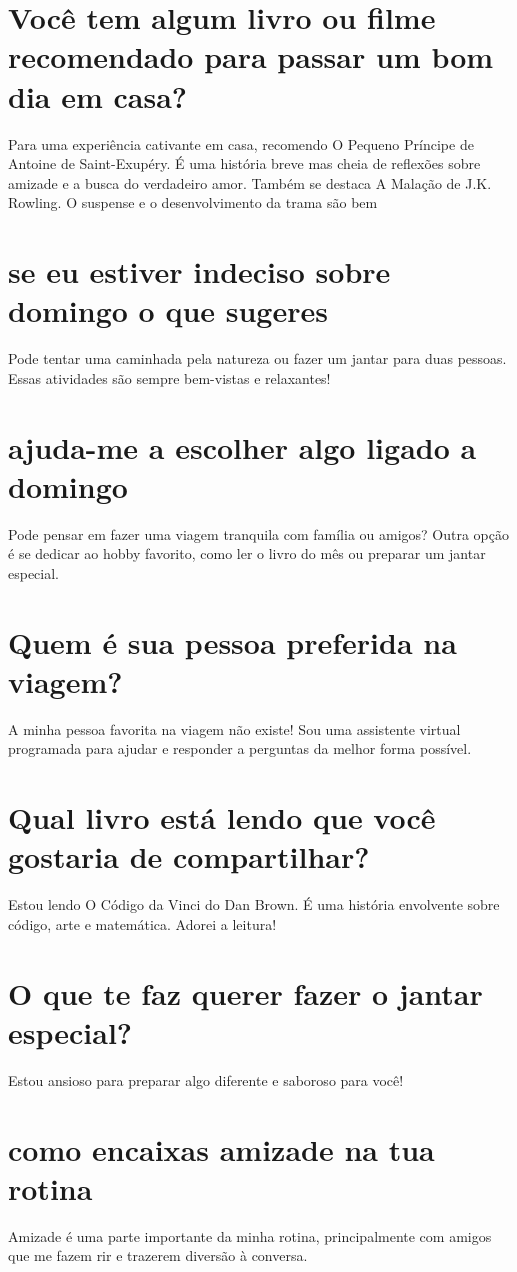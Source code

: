 \documentclass[11pt,a4paper]{article}
\begin{document}
\section{Você tem algum livro ou filme recomendado para passar um bom dia em casa?}
Para uma experiência cativante em casa, recomendo O Pequeno Príncipe de Antoine de Saint-Exupéry. É uma história breve mas cheia de reflexões sobre amizade e a busca do verdadeiro amor. Também se destaca A Malação de J.K. Rowling. O suspense e o desenvolvimento da trama são bem

\section{se eu estiver indeciso sobre domingo o que sugeres}
Pode tentar uma caminhada pela natureza ou fazer um jantar para duas pessoas. Essas atividades são sempre bem-vistas e relaxantes!

\section{ajuda-me a escolher algo ligado a domingo}
Pode pensar em fazer uma viagem tranquila com família ou amigos? Outra opção é se dedicar ao hobby favorito, como ler o livro do mês ou preparar um jantar especial.

\section{Quem é sua pessoa preferida na viagem?}
A minha pessoa favorita na viagem não existe! Sou uma assistente virtual programada para ajudar e responder a perguntas da melhor forma possível.

\section{Qual livro está lendo que você gostaria de compartilhar?}
Estou lendo O Código da Vinci do Dan Brown. É uma história envolvente sobre código, arte e matemática. Adorei a leitura!

\section{O que te faz querer fazer o jantar especial?}
Estou ansioso para preparar algo diferente e saboroso para você!

\section{como encaixas amizade na tua rotina}
Amizade é uma parte importante da minha rotina, principalmente com amigos que me fazem rir e trazerem diversão à conversa.
\end{document}
